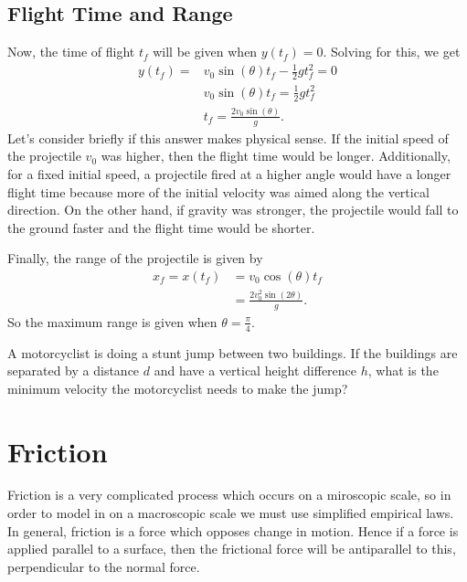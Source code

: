 \documentclass[../classical_mechanics.tex]{subfiles}
\begin{document}
        \subsection{Flight Time and Range}\label{sec:projectile-motion:subsec:flight-time-and-range}
            Now, the time of flight $t_f$ will be given when $y(t_f)=0$.
            Solving for this, we get
            \begin{align}
                y(t_f) = &v_0\sin(\theta)t_f - \frac{1}{2}gt_f^2 = 0\\
                &v_0\sin(\theta)t_f = \frac{1}{2}gt_f^2\\
                &t_f = \frac{2v_0\sin(\theta)}{g}.
            \end{align}
            Let's consider briefly if this answer makes physical sense.
            If the initial speed of the projectile $v_0$ was higher, then the flight time would be longer.
            Additionally, for a fixed initial speed, a projectile fired at a higher angle would have a longer flight time because more of the initial velocity was aimed along the vertical direction.
            On the other hand, if gravity was stronger, the projectile would fall to the ground faster and the flight time would be shorter.

            Finally, the range of the projectile is given by
            \begin{align}
                x_f = x(t_f) &= v_0\cos(\theta)t_f\\
                &= \frac{2v_0^2\sin(2\theta)}{g}.
            \end{align}
            So the maximum range is given when $\theta=\frac{\pi}{4}$.


            \begin{example}
                A motorcyclist is doing a stunt jump between two buildings.
                If the buildings are separated by a distance $d$ and have a vertical height difference $h$, what is the minimum velocity the motorcyclist needs to make the jump?
            \end{example}

    \section{Friction}\label{sec:friction}
        Friction is a very complicated process which occurs on a miroscopic scale, so in order to model in on a macroscopic scale we must use simplified empirical laws.
        In general, friction is a force which opposes change in motion. Hence if a force is applied parallel to a surface, then the frictional force will be antiparallel to this, perpendicular to the normal force.
\end{document}
